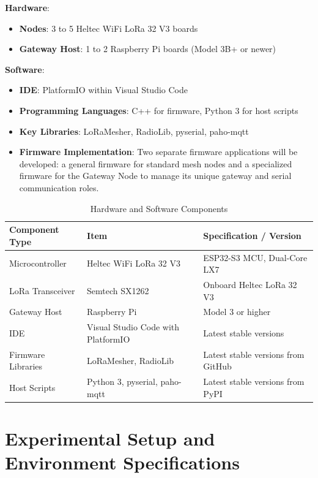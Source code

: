 \textbf{Hardware}:

\begin{itemize}
\item \textbf{Nodes}: 3 to 5 Heltec WiFi LoRa 32 V3 boards
\item \textbf{Gateway Host}: 1 to 2 Raspberry Pi boards (Model 3B+ or newer)
\end{itemize}

\textbf{Software}:

\begin{itemize}
\item \textbf{IDE}: PlatformIO within Visual Studio Code
\item \textbf{Programming Languages}: C++ for firmware, Python 3 for host scripts
\item \textbf{Key Libraries}: LoRaMesher, RadioLib, pyserial, paho-mqtt
\item \textbf{Firmware Implementation}: Two separate firmware applications will be developed: a general firmware for standard mesh nodes and a specialized firmware for the Gateway Node to manage its unique gateway and serial communication roles.
\end{itemize}

\begin{table}[h]
\centering
\caption{Hardware and Software Components}
\label{tab:hardware-software}
\begin{tabular}{p{3.5cm}p{4.5cm}p{5cm}}
\hline
\textbf{Component Type} & \textbf{Item} & \textbf{Specification / Version} \\
\hline
Microcontroller & Heltec WiFi LoRa 32 V3 & ESP32-S3 MCU, Dual-Core LX7 \\
\hline
LoRa Transceiver & Semtech SX1262 & Onboard Heltec LoRa 32 V3 \\
\hline
Gateway Host & Raspberry Pi & Model 3 or higher \\
\hline
IDE & Visual Studio Code with PlatformIO & Latest stable versions \\
\hline
Firmware Libraries & LoRaMesher, RadioLib & Latest stable versions from GitHub \\
\hline
Host Scripts & Python 3, pyserial, paho-mqtt & Latest stable versions from PyPI \\
\hline
\end{tabular}
\end{table}

\section{Experimental Setup and Environment Specifications}

